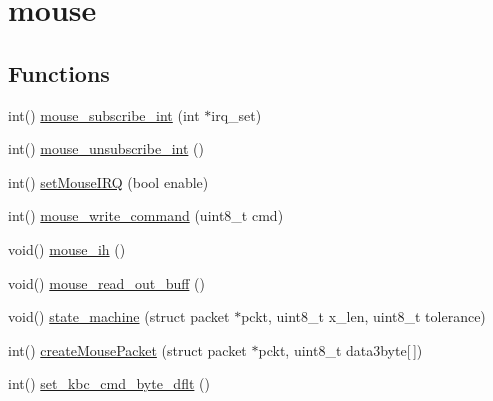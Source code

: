 \hypertarget{group__mouse}{}\section{mouse}
\label{group__mouse}
\subsection*{Functions}
\begin{DoxyCompactItemize}
\item 
int() \hyperlink{group__mouse_gaf55e4d1ccae1ac1f59dfa4222fd5de8e}{mouse\+\_\+subscribe\+\_\+int} (int $\ast$irq\+\_\+set)
\item 
int() \hyperlink{group__mouse_ga3ecf823d80520009ae5e0d76ae40a3c3}{mouse\+\_\+unsubscribe\+\_\+int} ()
\item 
int() \hyperlink{group__mouse_ga8931196769eb020bd34b8b93ee8c1ef6}{set\+Mouse\+I\+RQ} (bool enable)
\item 
int() \hyperlink{group__mouse_ga090c9bebd05709adc5de77ab5b26d7c3}{mouse\+\_\+write\+\_\+command} (uint8\+\_\+t cmd)
\item 
void() \hyperlink{group__mouse_ga210374b50462acdedab00df64d5cea3c}{mouse\+\_\+ih} ()
\item 
void() \hyperlink{group__mouse_ga3f43ee9f00f28eb503b80a8589216e5f}{mouse\+\_\+read\+\_\+out\+\_\+buff} ()
\item 
void() \hyperlink{group__mouse_ga025476b3734400554e7ead9c841b9ed9}{state\+\_\+machine} (struct packet $\ast$pckt, uint8\+\_\+t x\+\_\+len, uint8\+\_\+t tolerance)
\item 
int() \hyperlink{group__mouse_gabd35692be21807c9d3f1ae016fe7d6ec}{create\+Mouse\+Packet} (struct packet $\ast$pckt, uint8\+\_\+t data3byte\mbox{[}$\,$\mbox{]})
\item 
int() \hyperlink{group__mouse_gae5083fea5f4e764204c98e646ac25cc6}{set\+\_\+kbc\+\_\+cmd\+\_\+byte\+\_\+dflt} ()
\end{DoxyCompactItemize}
